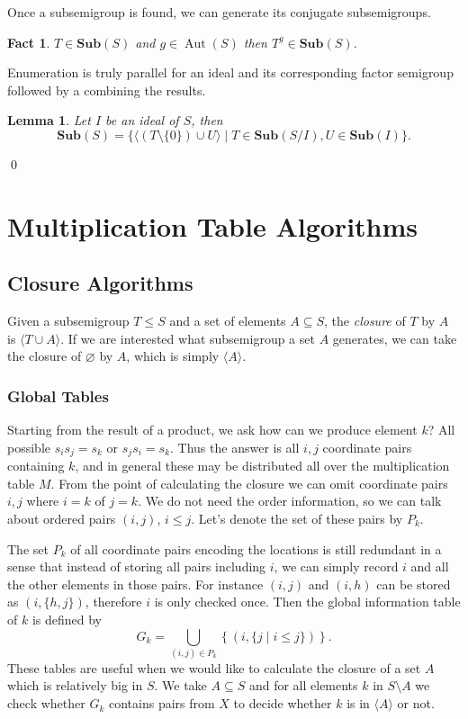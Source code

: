 \documentclass{amsart}
\newcommand{\Sub}{\mathbf{Sub}}
\DeclareMathOperator{\Aut}{Aut}
\theoremstyle{plain}
\newtheorem{lemma}[theorem]{Lemma}
\newtheorem{fact}[theorem]{Fact}
\theoremstyle{definition}
\begin{document}
Once a subsemigroup is found, we can generate its conjugate subsemigroups.
\begin{fact}
$T\in\Sub(S)$ and $g\in \Aut(S)$ then $T^g\in\Sub(S)$.%
\end{fact}


Enumeration is truly parallel for an ideal and its corresponding factor semigroup followed by a combining the results.
\begin{lemma}
Let $I$ be an ideal of $S$, then $$\Sub(S)=\big\{\langle (T\setminus\{0\})\cup U \rangle\mid T\in \Sub(S/I), U\in\Sub(I)\big\}.$$
\end{lemma}
\proof

\qed

\section{Multiplication Table Algorithms}

\subsection{Closure Algorithms}
Given a subsemigroup $T\leq S$ and a set of elements  $A\subseteq S$, the \emph{closure} of $T$ by $A$ is $\langle T\cup A \rangle$.
If we are interested what subsemigroup a set $A$ generates, we can take the closure of $\varnothing$ by $A$, which is simply $\langle A\rangle$.
\subsubsection{Global Tables}
Starting from the result of a product, we ask how can we produce element $k$?
All possible $s_is_j=s_k$ or $s_js_i=s_k$.
Thus the  answer is all $i,j$ coordinate pairs containing $k$, and in general these may be distributed all over the multiplication table $M$.
From the point of calculating the closure we can  omit coordinate pairs $i,j$ where $i=k$ of $j=k$. 
We do not need the order information, so we can talk about ordered pairs $(i,j)$, $i\leq j$. 
Let's denote the set of these pairs by $P_k$.

The set $P_k$ of all coordinate pairs encoding the locations is still redundant in a sense that instead of storing all pairs including $i$, we can simply record $i$ and all the other elements in those pairs.
For instance $(i,j)$ and $(i,h)$ can be stored as $(i,\{h,j\})$, therefore $i$ is only checked once.
Then the  global information table of $k$ is defined by
$$G_k=\bigcup_{(i,j)\in P_k} \left\{ (i,\{j\mid i\leq j\})\right\}.$$
These tables are useful when we would like to calculate the closure of a set $A$ which is relatively big in $S$.
We take $A\subseteq S$ and for all elements $k$ in $S\setminus A$ we check whether $G_k$ contains pairs from $X$ to decide whether $k$ is in $\langle A\rangle$ or not. 
\end{document}
